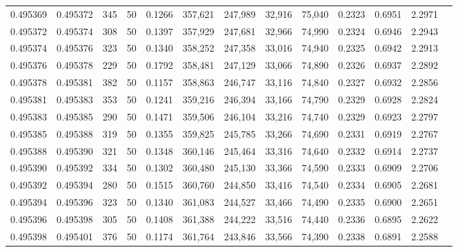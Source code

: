 \begin{tabular}{rrrrrrrrrrrrr}
0.495369 & 0.495372 &   345 &  50 &                                     0.1266 & 357,621 & 247,989 &  32,916 &  75,040 & 0.2323 & 0.6951 & 2.2971 \\
0.495372 & 0.495374 &   308 &  50 &                                     0.1397 & 357,929 & 247,681 &  32,966 &  74,990 & 0.2324 & 0.6946 & 2.2943 \\
0.495374 & 0.495376 &   323 &  50 &                                     0.1340 & 358,252 & 247,358 &  33,016 &  74,940 & 0.2325 & 0.6942 & 2.2913 \\
0.495376 & 0.495378 &   229 &  50 &                                     0.1792 & 358,481 & 247,129 &  33,066 &  74,890 & 0.2326 & 0.6937 & 2.2892 \\
0.495378 & 0.495381 &   382 &  50 &                                     0.1157 & 358,863 & 246,747 &  33,116 &  74,840 & 0.2327 & 0.6932 & 2.2856 \\
0.495381 & 0.495383 &   353 &  50 &                                     0.1241 & 359,216 & 246,394 &  33,166 &  74,790 & 0.2329 & 0.6928 & 2.2824 \\
0.495383 & 0.495385 &   290 &  50 &                                     0.1471 & 359,506 & 246,104 &  33,216 &  74,740 & 0.2329 & 0.6923 & 2.2797 \\
0.495385 & 0.495388 &   319 &  50 &                                     0.1355 & 359,825 & 245,785 &  33,266 &  74,690 & 0.2331 & 0.6919 & 2.2767 \\
0.495388 & 0.495390 &   321 &  50 &                                     0.1348 & 360,146 & 245,464 &  33,316 &  74,640 & 0.2332 & 0.6914 & 2.2737 \\
0.495390 & 0.495392 &   334 &  50 &                                     0.1302 & 360,480 & 245,130 &  33,366 &  74,590 & 0.2333 & 0.6909 & 2.2706 \\
0.495392 & 0.495394 &   280 &  50 &                                     0.1515 & 360,760 & 244,850 &  33,416 &  74,540 & 0.2334 & 0.6905 & 2.2681 \\
0.495394 & 0.495396 &   323 &  50 &                                     0.1340 & 361,083 & 244,527 &  33,466 &  74,490 & 0.2335 & 0.6900 & 2.2651 \\
0.495396 & 0.495398 &   305 &  50 &                                     0.1408 & 361,388 & 244,222 &  33,516 &  74,440 & 0.2336 & 0.6895 & 2.2622 \\
0.495398 & 0.495401 &   376 &  50 &                                     0.1174 & 361,764 & 243,846 &  33,566 &  74,390 & 0.2338 & 0.6891 & 2.2588 \\

\end{tabular}
